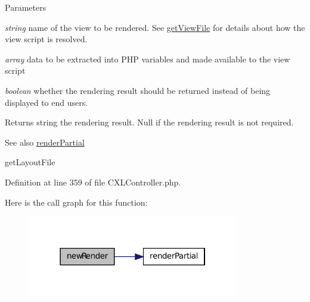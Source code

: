 \begin{DoxyParams}{Parameters}
\item[{\em string}]name of the view to be rendered. See \hyperlink{}{getViewFile} for details about how the view script is resolved. \item[{\em array}]data to be extracted into PHP variables and made available to the view script \item[{\em boolean}]whether the rendering result should be returned instead of being displayed to end users. \end{DoxyParams}
\begin{DoxyReturn}{Returns}
string the rendering result. Null if the rendering result is not required. 
\end{DoxyReturn}
\begin{DoxySeeAlso}{See also}
\hyperlink{classCXLController_a8324b095d3faa196d784f84a3f0cef25}{renderPartial} 

getLayoutFile 
\end{DoxySeeAlso}


Definition at line 359 of file CXLController.php.








Here is the call graph for this function:\nopagebreak
\begin{figure}[H]
\begin{center}
\leavevmode
\includegraphics[width=262pt]{classCXLController_acaf53d84b70927098a40b8e626985146_cgraph}
\end{center}
\end{figure}


